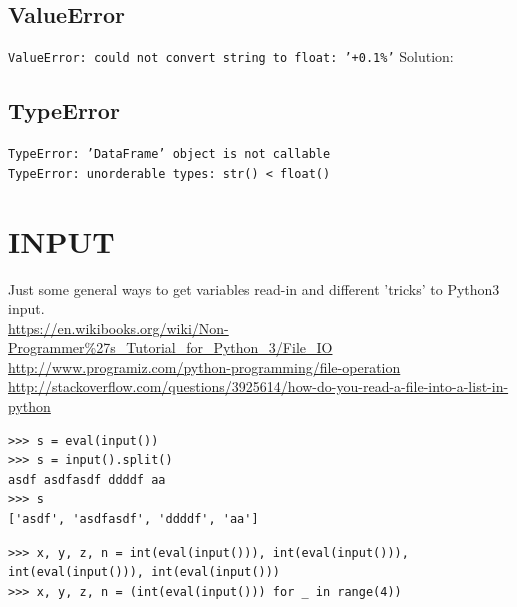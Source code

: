 \documentclass[11pt,a4paper]{article}
\begin{document}
    \subsection{ValueError}
    {\tt ValueError: could not convert string to float: '+0.1\%'}
    Solution:


    \subsection{TypeError}
    {\tt TypeError: 'DataFrame' object is not callable}\\


    {\tt TypeError: unorderable types: str() < float()}












\newpage
\section{INPUT}
Just some general ways to get variables read-in and different 'tricks' to Python3 input. \\
\href{https://en.wikibooks.org/wiki/Non-Programmer\%27s\_Tutorial\_for\_Python\_3/File\_IO}{https://en.wikibooks.org/wiki/Non-Programmer\%27s\_Tutorial\_for\_Python\_3/File\_IO}\\
\href{http://www.programiz.com/python-programming/file-operation}{http://www.programiz.com/python-programming/file-operation}\\
\href{http://stackoverflow.com/questions/3925614/how-do-you-read-a-file-into-a-list-in-python}{http://stackoverflow.com/questions/3925614/how-do-you-read-a-file-into-a-list-in-python}\\


\begin{lstlisting}
>>> s = eval(input())
>>> s = input().split()
asdf asdfasdf ddddf aa
>>> s
['asdf', 'asdfasdf', 'ddddf', 'aa']
\end{lstlisting}

\begin{lstlisting}
>>> x, y, z, n = int(eval(input())), int(eval(input())), int(eval(input())), int(eval(input()))
>>> x, y, z, n = (int(eval(input())) for _ in range(4))
\end{lstlisting}
\end{document}

